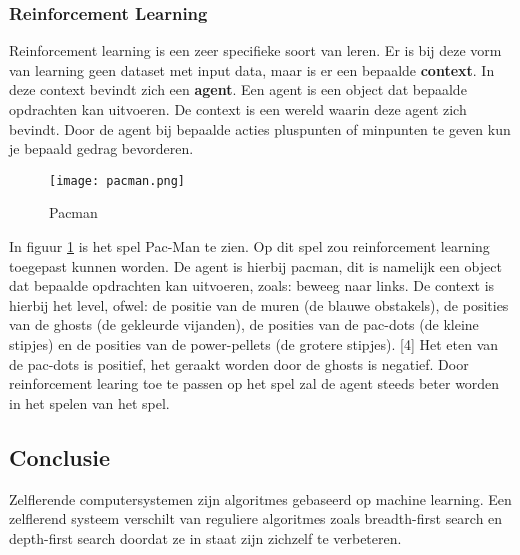\subsubsection{Reinforcement Learning}
Reinforcement learning is een zeer specifieke soort van leren. Er is bij deze vorm van learning geen dataset met input data, maar is er een bepaalde \textbf{context}. In deze context bevindt zich een \textbf{agent}. Een agent is een object dat bepaalde opdrachten kan uitvoeren. De context is een wereld waarin deze agent zich bevindt. Door de agent bij bepaalde acties pluspunten of minpunten te geven kun je bepaald gedrag bevorderen.  

\begin{figure}[h]
  \centering
    \texttt{[image: pacman.png]}
  \caption{Pacman}
  \label{fig:Pacman}
\end{figure}

In figuur \ref{fig:Pacman} is het spel Pac-Man te zien. Op dit spel zou reinforcement learning toegepast kunnen worden. De agent is hierbij pacman, dit is namelijk een object dat bepaalde opdrachten kan uitvoeren, zoals: beweeg naar links. De context is hierbij het level, ofwel: de positie van de muren (de blauwe obstakels), de posities van de ghosts (de gekleurde vijanden), de posities van de pac-dots (de kleine stipjes) en de posities van de power-pellets (de grotere stipjes). [4] Het eten van de pac-dots is positief, het geraakt worden door de ghosts is negatief. Door reinforcement learing toe te passen op het spel zal de agent steeds beter worden in het spelen van het spel. 

\subsection{Conclusie}
Zelflerende computersystemen zijn algoritmes gebaseerd op machine learning. Een zelflerend systeem verschilt van reguliere algoritmes zoals breadth-first search en depth-first search doordat ze in staat zijn zichzelf te verbeteren.
\newpage

